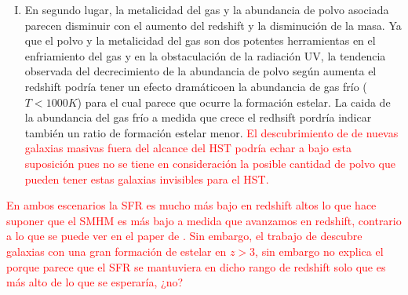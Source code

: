 \documentclass{article}
\begin{document}
\begin{enumerate}[I) ]
\item En segundo lugar, la metalicidad del gas y la abundancia de polvo asociada parecen disminuir con el aumento del redshift y la disminución de la masa. Ya que el polvo y la metalicidad del gas son dos potentes herramientas en el enfriamiento del gas y en la obstaculación de la radiación UV, la tendencia observada del decrecimiento de la abundancia de polvo según aumenta el redshift podría tener un efecto dramáticoen la abundancia de gas frío ($T<1000 K$) para el cual parece que ocurre la formación estelar. La caida de la abundancia del gas frío a medida que crece el redhsift pordría indicar también un ratio de formación estelar menor. \textcolor{red}{El descubrimiento de \cite{wang2019dominant} de nuevas galaxias masivas fuera del alcance del HST podría echar a bajo esta suposición pues no se tiene en consideración la posible cantidad de polvo que pueden tener estas galaxias invisibles para el HST.}
\end{enumerate}

\textcolor{red}{En ambos escenarios la SFR es mucho más bajo en redshift altos lo que hace suponer que el SMHM es más bajo a medida que avanzamos en redshift, contrario a lo que se puede ver en el paper de \cite{finkelstein2015increasing}. Sin embargo, el trabajo de \cite{wang2019dominant} descubre galaxias con una gran formación de estelar en $z>3$, sin embargo no explica el porque parece que el SFR se mantuviera en dicho rango de redshift solo que es más alto de lo que se esperaría, ¿no?} \\
\end{document}

